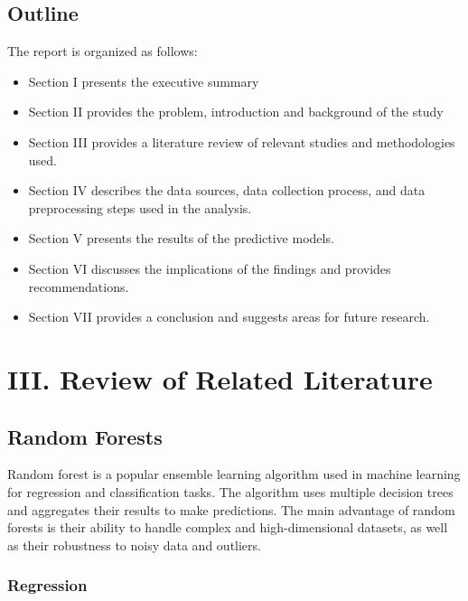 \hypertarget{outline}{%
\subsection{Outline}\label{outline}}

The report is organized as follows:

\begin{itemize}
\tightlist
\item
  Section I presents the executive summary
\item
  Section II provides the problem, introduction and background of the
  study
\item
  Section III provides a literature review of relevant studies and
  methodologies used.
\item
  Section IV describes the data sources, data collection process, and
  data preprocessing steps used in the analysis.
\item
  Section V presents the results of the predictive models.
\item
  Section VI discusses the implications of the findings and provides
  recommendations.
\item
  Section VII provides a conclusion and suggests areas for future
  research.
\end{itemize}

\hypertarget{iii-review-of-related-literature}{%
\section{III. Review of Related
Literature}\label{iii-review-of-related-literature}}

\hypertarget{random-forests}{%
\subsection{Random Forests}\label{random-forests}}

Random forest is a popular ensemble learning algorithm used in machine
learning for regression and classification tasks. The algorithm uses
multiple decision trees and aggregates their results to make
predictions. The main advantage of random forests is their ability to
handle complex and high-dimensional datasets, as well as their
robustness to noisy data and outliers.

\hypertarget{regression}{%
\subsubsection{Regression}\label{regression}}

